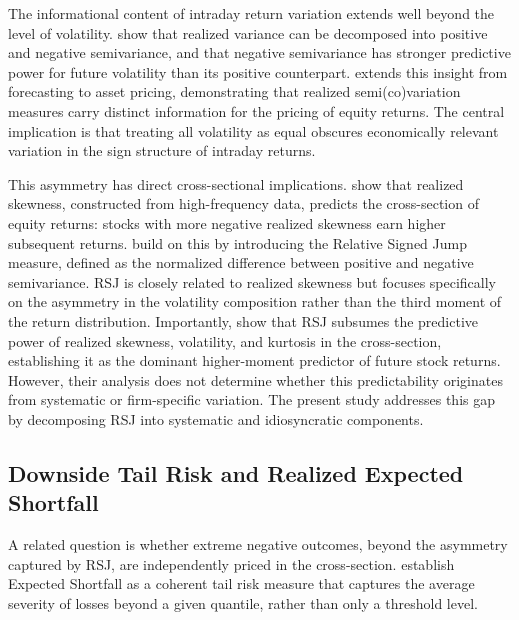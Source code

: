 \documentclass[11pt,a4paper]{article}
\begin{document}
The informational content of intraday return variation extends well beyond the level of volatility. \citet{barndorff2010} show that realized variance can be decomposed into positive and negative semivariance, and that negative semivariance has stronger predictive power for future volatility than its positive counterpart. \citet{bollerslev2022} extends this insight from forecasting to asset pricing, demonstrating that realized semi(co)variation measures carry distinct information for the pricing of equity returns. The central implication is that treating all volatility as equal obscures economically relevant variation in the sign structure of intraday returns.

This asymmetry has direct cross-sectional implications. \citet{amaya2015} show that realized skewness, constructed from high-frequency data, predicts the cross-section of equity returns: stocks with more negative realized skewness earn higher subsequent returns. \citet{bollerslev2020} build on this by introducing the Relative Signed Jump measure, defined as the normalized difference between positive and negative semivariance. RSJ is closely related to realized skewness but focuses specifically on the asymmetry in the volatility composition rather than the third moment of the return distribution. Importantly, \citet{bollerslev2020} show that RSJ subsumes the predictive power of realized skewness, volatility, and kurtosis in the cross-section, establishing it as the dominant higher-moment predictor of future stock returns. However, their analysis does not determine whether this predictability originates from systematic or firm-specific variation. The present study addresses this gap by decomposing RSJ into systematic and idiosyncratic components.

\subsection{Downside Tail Risk and Realized Expected Shortfall}

A related question is whether extreme negative outcomes, beyond the asymmetry captured by RSJ, are independently priced in the cross-section. \citet{artzner1999} establish Expected Shortfall as a coherent tail risk measure that captures the average severity of losses beyond a given quantile, rather than only a threshold level.
\end{document}
